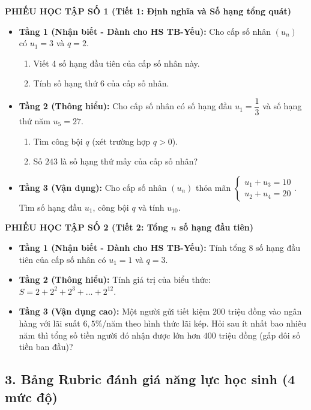 \documentclass[12pt, a4paper]{article}
\begin{document}
\noindent \textbf{PHIẾU HỌC TẬP SỐ 1 (Tiết 1: Định nghĩa và Số hạng tổng quát)}
\begin{itemize}[leftmargin=0.6cm]
    \item \textbf{Tầng 1 (Nhận biết - Dành cho HS TB-Yếu):}
    Cho cấp số nhân $(u_n)$ có $u_1 = 3$ và $q = 2$.
    \begin{enumerate}[leftmargin=0.6cm]
        \item[a)] Viết 4 số hạng đầu tiên của cấp số nhân này.
        \item[b)] Tính số hạng thứ 6 của cấp số nhân.
    \end{enumerate}
    \item \textbf{Tầng 2 (Thông hiểu):}
    Cho cấp số nhân có số hạng đầu $u_1 = \dfrac{1}{3}$ và số hạng thứ năm $u_5 = 27$.
    \begin{enumerate}[leftmargin=0.6cm]
        \item[a)] Tìm công bội $q$ (xét trường hợp $q > 0$).
        \item[b)] Số $243$ là số hạng thứ mấy của cấp số nhân?
    \end{enumerate}
    \item \textbf{Tầng 3 (Vận dụng):}
    Cho cấp số nhân $(u_n)$ thỏa mãn $\begin{cases} u_1 + u_3 = 10 \\ u_2 + u_4 = 20 \end{cases}$. Tìm số hạng đầu $u_1$, công bội $q$ và tính $u_{10}$.
\end{itemize}

\vspace{5pt}
\noindent \textbf{PHIẾU HỌC TẬP SỐ 2 (Tiết 2: Tổng $n$ số hạng đầu tiên)}
\begin{itemize}[leftmargin=0.6cm]
    \item \textbf{Tầng 1 (Nhận biết - Dành cho HS TB-Yếu):}
    Tính tổng 8 số hạng đầu tiên của cấp số nhân có $u_1 = 1$ và $q = 3$.
    \item \textbf{Tầng 2 (Thông hiểu):}
    Tính giá trị của biểu thức: $S = 2 + 2^2 + 2^3 + \dots + 2^{12}$.
    \item \textbf{Tầng 3 (Vận dụng cao):}
    Một người gửi tiết kiệm $200$ triệu đồng vào ngân hàng với lãi suất $6{,}5\%$/năm theo hình thức lãi kép. Hỏi sau ít nhất bao nhiêu năm thì tổng số tiền người đó nhận được lớn hơn $400$ triệu đồng (gấp đôi số tiền ban đầu)?
\end{itemize}

\subsection*{3. Bảng Rubric đánh giá năng lực học sinh (4 mức độ)}
\end{document}
